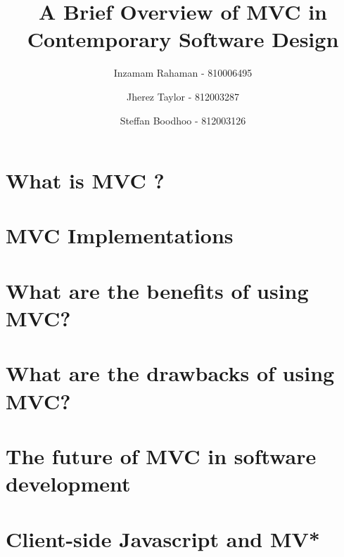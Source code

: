 \documentclass[
oneside,
openany,
12pt, a4paper,
footinclude=true,
headinclude=true,
cleardoublepage=empty
]{scrbook}
\title{A Brief Overview of MVC in Contemporary Software Design}
\author{Inzamam Rahaman - 810006495 \and Jherez Taylor - 812003287 \and Steffan Boodhoo - 812003126 }
\begin{document}
  \maketitle

  
  


  \chapter{What is MVC ?}
  

  \chapter{MVC Implementations}
  

  \chapter{What are the benefits of using MVC?}
  

  \chapter{What are the drawbacks of using MVC?}
  

  \chapter{The future of MVC in software development}
  

  \chapter{Client-side Javascript and MV*}
  
\end{document}
